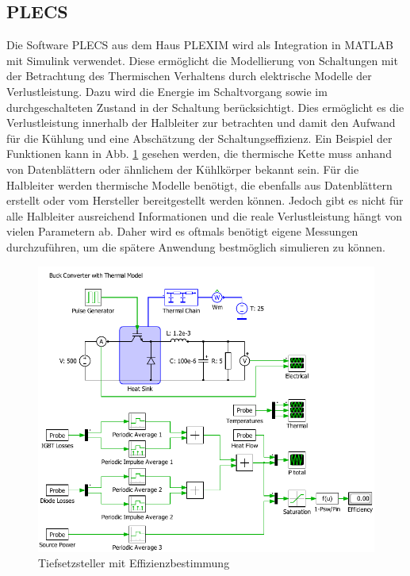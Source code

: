 	\subsection{PLECS}
	Die Software \gls{PLECS} aus dem Haus PLEXIM wird als Integration in MATLAB mit Simulink verwendet.  Diese ermöglicht die Modellierung von Schaltungen mit der Betrachtung des Thermischen Verhaltens durch elektrische Modelle der Verlustleistung. Dazu wird die Energie im Schaltvorgang sowie im durchgeschalteten Zustand in der Schaltung berücksichtigt. Dies ermöglicht es die Verlustleistung innerhalb der Halbleiter zur betrachten und damit den Aufwand für die Kühlung und eine Abschätzung der Schaltungseffizienz. Ein Beispiel der Funktionen kann in Abb. \ref{fig:plecsbuck} gesehen werden, die thermische Kette muss anhand von Datenblättern oder ähnlichem der Kühlkörper bekannt sein. Für die Halbleiter werden thermische Modelle benötigt, die ebenfalls aus Datenblättern erstellt oder vom Hersteller bereitgestellt werden können. Jedoch gibt es nicht für alle Halbleiter ausreichend Informationen und die reale Verlustleistung hängt von vielen Parametern ab. Daher wird es oftmals benötigt eigene Messungen durchzuführen, um die spätere Anwendung bestmöglich simulieren zu können.   \\
	
	\begin{figure}
		\centering
		\includegraphics[width=0.7\linewidth]{content/Grafiken/PLECS_Buck}
		\caption[Tiefsetzsteller mit Effizienzbestimmung]{Tiefsetzsteller mit Effizienzbestimmung}
		\label{fig:plecsbuck}
	\end{figure}
	